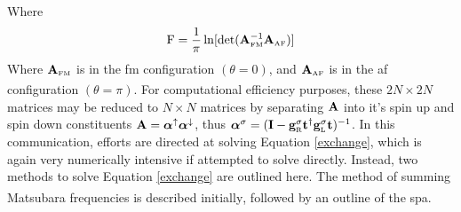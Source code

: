 \documentclass[a4paper, 12pt]{article}
\begin{document}
Where
\begin{equation}\label{F}
	\rm F = \frac{1}{\pi}\ln [det(\bf A_{\rm \scriptscriptstyle FM}^{\rm -1}A_{\rm \scriptscriptstyle AF})]
\end{equation}
Where $\bf A_{\rm \scriptscriptstyle FM}$ is in the \gls{fm} configuration $(\theta = 0)$, and $\bf A_{\rm \scriptscriptstyle AF}$ is in the \gls{af} configuration $(\theta = \pi)$\textcolor{blue}{\textsuperscript{\cite{rev3}}}. For computational efficiency purposes, these $2N\times2N$ matrices may be reduced to $N\times N$ matrices by separating $\bf A$ into it's spin up and spin down constituents $\bf A = \bm \alpha^\uparrow \bm\alpha^\downarrow$,
thus $\bm \alpha^\sigma = \bf(I - g_{\rm\scriptscriptstyle R}^\sigma t^\dag g_{\rm\scriptscriptstyle L}^\sigma t)^{\rm-1}$.
In this communication, efforts are directed at solving Equation \eqref{exchange}, which is again very numerically intensive if attempted to solve directly. Instead, two methods to solve Equation \eqref{exchange} are outlined here. The method of summing Matsubara frequencies is described initially\textcolor{blue}{\textsuperscript{\cite{mats}}}, followed by an outline of the \gls{spa}\textcolor{blue}{\textsuperscript{\cite{rev1}}}.
\end{document}
